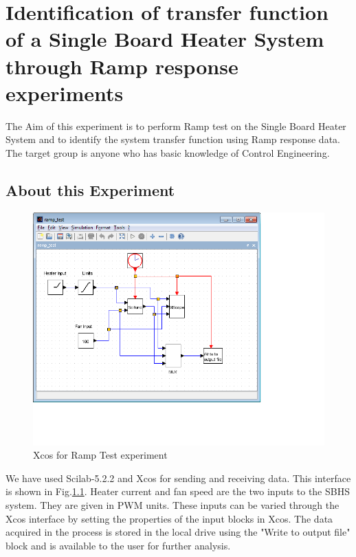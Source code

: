 \chapter{Identification of transfer function of a Single Board Heater System through Ramp response experiments}
The Aim of this experiment is to perform Ramp test on the Single Board Heater System and to identify the system transfer function using Ramp response data. The target group is anyone who has basic knowledge of Control Engineering.
\section{About this Experiment}

\begin{figure}
\centering
\includegraphics[width=0.7\linewidth]{Ramp-test_manual/ramp_xcos.jpg}
\caption{Xcos for Ramp Test experiment}
\label{Xcos_rt}
\end{figure} 
We have used Scilab-5.2.2 and Xcos for sending and receiving data. This interface is shown in Fig.\ref{Xcos_rt}. Heater current and fan speed are the two inputs to the SBHS system. They are given in PWM units. These inputs can be varied through the Xcos interface by setting the properties of the input blocks in Xcos. The data acquired in the process is stored in the local drive using the "Write to output file" block and is available to the user for further analysis.
